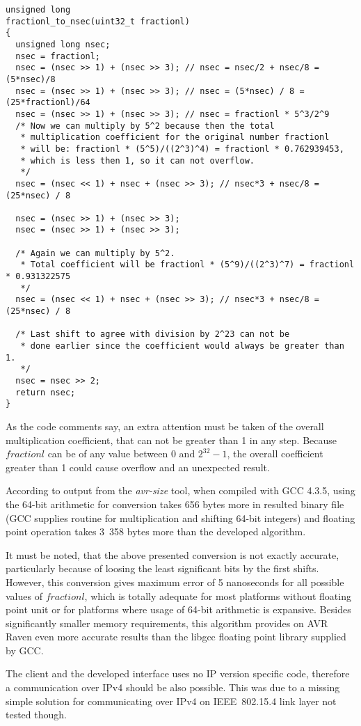 \begin{lstlisting}[caption=Conversion from NTP fraction part to nanoseconds]
unsigned long
fractionl_to_nsec(uint32_t fractionl)
{
  unsigned long nsec;
  nsec = fractionl;
  nsec = (nsec >> 1) + (nsec >> 3); // nsec = nsec/2 + nsec/8 = (5*nsec)/8
  nsec = (nsec >> 1) + (nsec >> 3); // nsec = (5*nsec) / 8 = (25*fractionl)/64
  nsec = (nsec >> 1) + (nsec >> 3); // nsec = fractionl * 5^3/2^9
  /* Now we can multiply by 5^2 because then the total
   * multiplication coefficient for the original number fractionl
   * will be: fractionl * (5^5)/((2^3)^4) = fractionl * 0.762939453,
   * which is less then 1, so it can not overflow.
   */
  nsec = (nsec << 1) + nsec + (nsec >> 3); // nsec*3 + nsec/8 = (25*nsec) / 8

  nsec = (nsec >> 1) + (nsec >> 3);
  nsec = (nsec >> 1) + (nsec >> 3);

  /* Again we can multiply by 5^2.
   * Total coefficient will be fractionl * (5^9)/((2^3)^7) = fractionl * 0.931322575
   */
  nsec = (nsec << 1) + nsec + (nsec >> 3); // nsec*3 + nsec/8 = (25*nsec) / 8

  /* Last shift to agree with division by 2^23 can not be
   * done earlier since the coefficient would always be greater than 1.
   */
  nsec = nsec >> 2;
  return nsec;
}
\end{lstlisting}
As the code comments say, an extra attention must be taken of the overall
multiplication coefficient,
that can not be greater than 1 in any step.
Because $fractionl$ can be of any value between $0$ and $2^{32}-1$,
the overall coefficient greater than 1 could cause overflow and an unexpected result.

According to output from the {\it{avr-size}} tool,
when compiled with GCC 4.3.5,
using the 64-bit arithmetic for conversion
takes 656 bytes more in %
resulted binary file (GCC supplies routine for multiplication and shifting 64-bit integers)
and floating point operation takes 3~358 bytes more
than the developed algorithm.

It must be noted, that the above presented conversion is not exactly accurate, particularly
because of loosing the least significant bits by the first shifts.
However, this conversion gives maximum error of 5 nanoseconds for all possible values of $fractionl$,
which is totally adequate for most platforms without floating point unit or
for platforms where usage of 64-bit arithmetic is expansive.
Besides significantly smaller memory requirements,
this algorithm provides on AVR Raven even more accurate results than the libgcc
floating point library supplied by GCC.

The client and the developed interface uses no IP version specific code,
therefore a communication over IPv4 should be also possible.
This was due to a missing simple solution for
communicating over IPv4 on IEEE~802.15.4 link layer not tested though.
